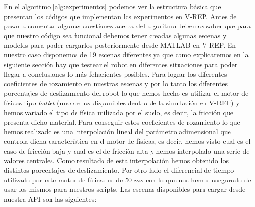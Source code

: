 En el algoritmo \ref{alg:experimentos} podemos ver la estructura básica que presentan los códigos que implementan los experimentos en V-REP.
Antes de pasar a comentar algunas cuestiones acerca del algoritmo debemos saber que para que nuestro código sea funcional debemos tener creadas algunas escenas y modelos para poder cargarlos posteriormente desde MATLAB en V-REP.
En nuestro caso disponemos de 19 escenas diferentes ya que como explicaremos en la siguiente sección hay que testear el robot en diferentes situaciones para poder llegar a conclusiones lo más fehacientes posibles.
%
%
%
Para lograr los diferentes coeficientes de rozamiento en nuestras escenas y por lo tanto los diferentes porcentajes de deslizamiento del robot lo que hemos hecho es utilizar el motor de físicas tipo \textit{bullet} (uno de los disponibles dentro de la simulación en V-REP) y hemos variado el tipo de física utilizada por el suelo, es decir, la fricción que presenta dicho material.
Para conseguir estos coeficientes de rozamiento lo que hemos realizado es una interpolación lineal del parámetro adimensional que controla dicha característica en el motor de físicas,  es decir, hemos visto cual es el caso de fricción baja y cual es el de fricción alta y hemos interpolado una serie de valores centrales.
Como resultado de esta interpolación hemos obtenido los distintos porcentajes de deslizamiento.
Por otro lado el diferencial de tiempo utilizado por este motor de físicas es de 50 $ms$  con lo que nos hemos asegurado de usar los mismos para nuestros scripts.
Las escenas disponibles para cargar desde nuestra API son las siguientes:
%
%
%
